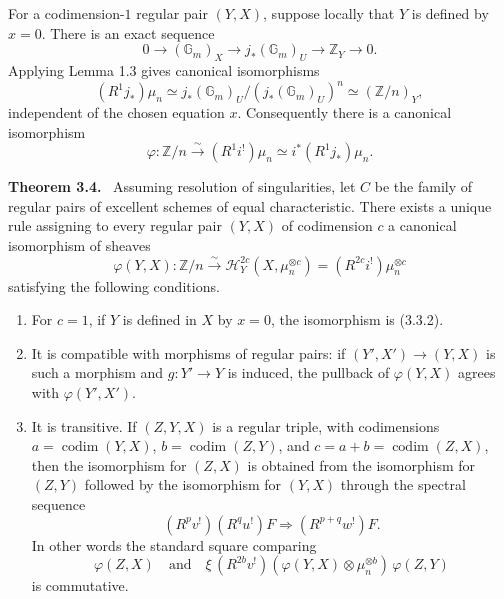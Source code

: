 \documentclass[12pt]{article}
\newcommand{\ZZ}{\mathbb Z}
\newcommand{\GG}{\mathbb G}
\DeclareMathOperator{\codim}{codim}
\newenvironment{statement}[1]{\par\medskip\noindent\textbf{#1.}\ }{\par\medskip}
\begin{document}
For a codimension-$1$ regular pair $(Y,X)$, suppose locally that $Y$ is defined by $x=0$. There is an exact sequence
\[
0\to(\GG_m)_X\to j_*(\GG_m)_U\to \ZZ_Y\to0.
\]
Applying Lemma 1.3 gives canonical isomorphisms
\begin{equation}
   (R^1j_*)\mu_n\simeq
   j_*(\GG_m)_U/(j_*(\GG_m)_U)^n\simeq(\ZZ/n)_Y, \tag{3.3.1}
\end{equation}
independent of the chosen equation $x$. Consequently there is a canonical isomorphism
\begin{equation}
   \varphi:\ZZ/n\xrightarrow{\sim}(R^1i^!)\mu_n
   \simeq i^*(R^1j_*)\mu_n. \tag{3.3.2}
\end{equation}

\begin{statement}{Theorem 3.4}
Assuming resolution of singularities, let $C$ be the family of regular pairs of excellent schemes of equal characteristic. There exists a unique rule assigning to every regular pair $(Y,X)$ of codimension $c$ a canonical isomorphism of sheaves
\[
   \varphi(Y,X):\ZZ/n\xrightarrow{\sim}
   \mathcal H_Y^{2c}(X,\mu_n^{\otimes c})=(R^{2c}i^!)\mu_n^{\otimes c}
\]
satisfying the following conditions.
\begin{enumerate}[label=(\roman*)]
\item For $c=1$, if $Y$ is defined in $X$ by $x=0$, the isomorphism is (3.3.2).
\item It is compatible with morphisms of regular pairs: if $(Y',X')\to(Y,X)$ is such a morphism and $g:Y'\to Y$ is induced, the pullback of $\varphi(Y,X)$ agrees with $\varphi(Y',X')$.
\item It is transitive. If $(Z,Y,X)$ is a regular triple, with codimensions $a=\codim(Y,X)$, $b=\codim(Z,Y)$, and $c=a+b=\codim(Z,X)$, then the isomorphism for $(Z,X)$ is obtained from the isomorphism for $(Z,Y)$ followed by the isomorphism for $(Y,X)$ through the spectral sequence
\[
   (R^pv^!)(R^qu^!)F\Longrightarrow(R^{p+q}w^!)F.
\]
In other words the standard square comparing
\[
   \varphi(Z,X)
   \quad\text{and}\quad
   \xi\,(R^{2b}v^!)(\varphi(Y,X)\otimes \mu_n^{\otimes b})\,\varphi(Z,Y)
\]
is commutative.
\end{enumerate}
\end{statement}
\end{document}
